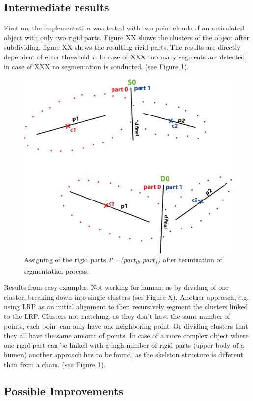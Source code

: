 \documentclass[a4paper,english,11pt]{report}
\begin{document}
\subsection{Intermediate results}

First on, the implementation was tested with two point clouds of an articulated object with only two rigid parts. Figure XX shows the clusters of the object after subdividing, figure XX shows the resulting rigid parts. The results are directly dependent of error threshold $\tau$. In case of XXX too many segments are detected, in case of XXX no segmentation is conducted. (see Figure \ref{fig:dc_results_2p}). 

\begin{figure}
	\centering
	\includegraphics[width=0.7\linewidth]{illustration_results}
	\caption{Assigning of the rigid parts \textit{P =(part\textsubscript{0}, part\textsubscript{1})} after termination of segmentation process.}
	\label{fig:dc_results_2p}
\end{figure}


Results from easy examples. Not working for human, as by dividing of one cluster, breaking down into single clusters (see Figure X). Another approach, e.g. using LRP as an initial alignment to then recursively segment the clusters linked to the LRP. Clusters not matching, as they don't have the same number of points, each point can only have one neighboring point. Or dividing clusters that they all have the same amount of points. In case of a more complex object where one rigid part can be linked with a high number of rigid parts (upper body of a humen) another approach has to be found, as the skeleton structure is different than from a chain. (see Figure \ref{fig:dc_results_2p}).

\subsection{Possible Improvements}
\end{document}
